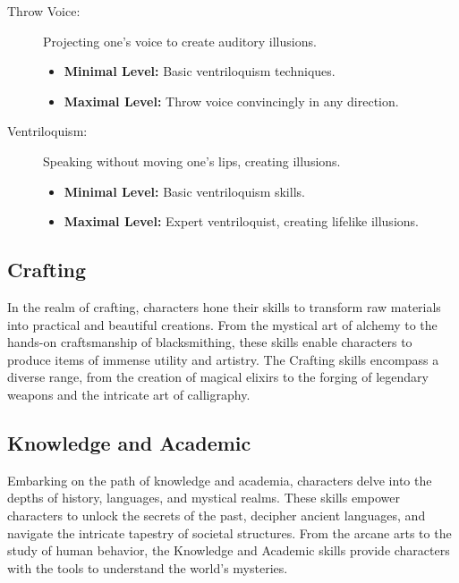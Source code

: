\documentclass[12pt]{book}
\begin{document}
\begin{description}
    \item[Throw Voice:] Projecting one's voice to create auditory illusions.
        \begin{itemize}
            \item \textbf{Minimal Level:} Basic ventriloquism techniques.
            \item \textbf{Maximal Level:} Throw voice convincingly in any direction.
        \end{itemize}

    \item[Ventriloquism:] Speaking without moving one's lips, creating illusions.
        \begin{itemize}
            \item \textbf{Minimal Level:} Basic ventriloquism skills.
            \item \textbf{Maximal Level:} Expert ventriloquist, creating lifelike illusions.
        \end{itemize}
\end{description}

\subsection{\textbf{Crafting}}

In the realm of crafting, characters hone their skills to transform raw materials into practical and beautiful creations. From the mystical art of alchemy to the hands-on craftsmanship of blacksmithing, these skills enable characters to produce items of immense utility and artistry. The Crafting skills encompass a diverse range, from the creation of magical elixirs to the forging of legendary weapons and the intricate art of calligraphy.

\subsection{\textbf{Knowledge and Academic}}

Embarking on the path of knowledge and academia, characters delve into the depths of history, languages, and mystical realms. These skills empower characters to unlock the secrets of the past, decipher ancient languages, and navigate the intricate tapestry of societal structures. From the arcane arts to the study of human behavior, the Knowledge and Academic skills provide characters with the tools to understand the world's mysteries.
\end{document}
